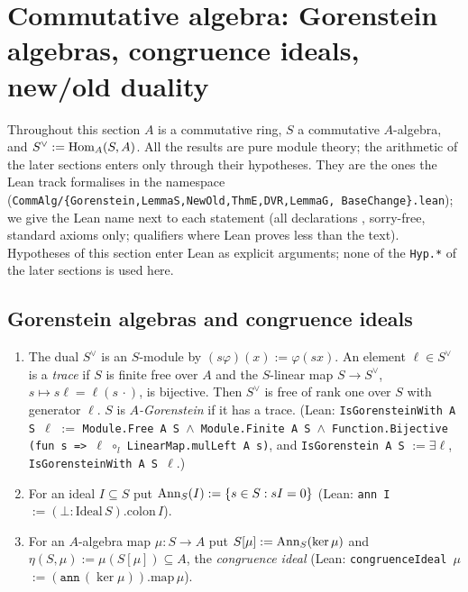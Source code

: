 \section{Commutative algebra: Gorenstein algebras, congruence ideals, new/old duality}\label{ss:s06-ca}

Throughout this section $A$ is a commutative ring, $S$ a commutative $A$-algebra, and $S^\vee:=\operatorname{Hom}_A(S,A)$. All the results
are pure module theory; the arithmetic of the later sections enters only through their hypotheses. They are the ones the Lean
track formalises in the namespace  (\texttt{CommAlg/\{Gorenstein,LemmaS,NewOld,ThmE,DVR,LemmaG,
BaseChange\}.lean}); we give the Lean name next to each statement (all declarations \stformalized{}, sorry-free, standard axioms only; qualifiers where Lean proves less than the text). Hypotheses of this section enter Lean as explicit arguments; none of the \texttt{Hyp.*} of the later sections is used here.

\subsection{Gorenstein algebras and congruence ideals}

\begin{definition}\label{def:s06-gor}
\leavevmode
\begin{enumerate}[label=(\alph*)]
\item The dual $S^\vee$ is an $S$-module by $(s\varphi)(x):=\varphi(sx)$. An element $\ell\in S^\vee$ is a \emph{trace} if $S$ is finite
  free over $A$ and the $S$-linear map $S\to S^\vee$, $s\mapsto s\ell=\ell(s\,\cdot)$, is bijective. Then $S^\vee$ is free of rank one over
  $S$ with generator $\ell$. $S$ is \emph{$A$-Gorenstein} if it has a trace.
  (Lean: \texttt{IsGorensteinWith A S \ensuremath{\ell}} $:=$ \texttt{Module.Free A S \ensuremath{\wedge} Module.Finite A S \ensuremath{\wedge} Function.Bijective
  (fun s => \ensuremath{\ell} \ensuremath{\circ}\ensuremath{_l} LinearMap.mulLeft A s)}, and \texttt{IsGorenstein A S} $:=\exists\ell$, \texttt{IsGorensteinWith A S \ensuremath{\ell}}.)
\item For an ideal $I\subseteq S$ put $\operatorname{Ann}_S(I):=\{s\in S:sI=0\}$ (Lean: \texttt{ann I} $:=(\bot:\mathrm{Ideal}\,S).\mathrm{colon}\,I$).
\item For an $A$-algebra map $\mu:S\to A$ put $S[\mu]:=\operatorname{Ann}_S(\ker\mu)$ and $\eta(S,\mu):=\mu(S[\mu])\subseteq A$, the
  \emph{congruence ideal} (Lean: \texttt{congruenceIdeal \ensuremath{\mu}} $:=(\texttt{ann}\,(\ker\mu)).\mathrm{map}\,\mu$).
\end{enumerate}
\end{definition}

